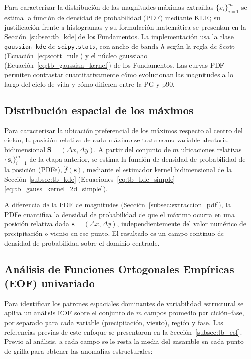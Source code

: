 Para caracterizar la distribución de las magnitudes máximas extraídas $\{x_i\}_{i=1}^{m}$ se estima la función de densidad de probabilidad (PDF) mediante KDE; su justificación frente a histogramas y su formulación matemática se presentan en la Sección~\ref{subsec:tb_kde} de los Fundamentos. La implementación usa la clase \texttt{gaussian\_kde} de \texttt{scipy.stats}, con ancho de banda $h$ según la regla de Scott (Ecuación~\ref{eq:scott_rule}) y el núcleo gaussiano (Ecuación~\ref{eq:tb_gaussian_kernel}) de los Fundamentos. Las curvas PDF permiten contrastar cuantitativamente cómo evolucionan las magnitudes a lo largo del ciclo de vida y cómo difieren entre la PG y p90.

\subsection{Distribución espacial de los máximos}\label{subsec:kde_localizacion}

Para caracterizar la ubicación preferencial de los máximos respecto al centro del ciclón, la posición relativa de cada máximo se trata como variable aleatoria bidimensional $\mathbf{S} = (\Delta x, \Delta y)$. A partir del conjunto de $m$ ubicaciones relativas $\{\mathbf{s}_i\}_{i=1}^{m}$ de la etapa anterior, se estima la función de densidad de probabilidad de la posición (PDFe), $\hat{f}(\mathbf{s})$, mediante el estimador kernel bidimensional de la Sección~\ref{subsec:tb_kde} (Ecuaciones~\ref{eq:tb_kde_simple}--\ref{eq:tb_gauss_kernel_2d_simple}).

A diferencia de la PDF de magnitudes (Sección~\ref{subsec:extraccion_pdf}), la PDFe cuantifica la densidad de probabilidad de que el máximo ocurra en una posición relativa dada $\mathbf{s} = (\Delta x, \Delta y)$, independientemente del valor numérico de precipitación o viento en ese punto. El resultado es un campo continuo de densidad de probabilidad sobre el dominio centrado.

\subsection{Análisis de Funciones Ortogonales Empíricas (EOF) univariado}\label{subsec:eof_univariado}

Para identificar los patrones espaciales dominantes de variabilidad estructural se aplica un análisis EOF sobre el conjunto de $m$ campos promedio por ciclón--fase, por separado para cada variable (precipitación, viento), región y fase. Las referencias previas de este enfoque se presentaron en la Sección~\ref{subsec:tb_eof}. Previo al análisis, a cada campo se le resta la media del ensamble en cada punto de grilla para obtener las anomalías estructurales:

